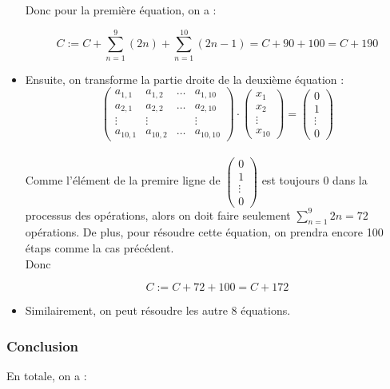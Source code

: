 \documentclass{article}
\begin{document}
\begin{itemize}
Donc pour la première équation, on a :
\begin{tcolorbox}
        \[
        C := C + \sum_{n=1}^{9}(2n) + \sum_{n=1}^{10}(2n-1) = C+90+100=C+190
        \]
\end{tcolorbox}
    \item Ensuite, on transforme la partie droite de la deuxième équation : $$\begin{pmatrix} a_{1,1} & a_{1,2} & \ldots & a_{1,10} \\
                a_{2,1} & a_{2,2} & \ldots & a_{2,10} \\
                \vdots & \vdots & & \vdots\\
                a_{10,1} & a_{10,2} & \ldots & a_{10,10}
            \end{pmatrix}\cdot\begin{pmatrix} 
            x_1\\
            x_2\\
            \vdots\\
            x_{10}
            \end{pmatrix}=\begin{pmatrix} 
            0\\
            1\\
            \vdots\\
            0
            \end{pmatrix}
    $$\\
    
Comme l'élément de la premire ligne de $\begin{pmatrix} 
            0\\
            1\\
            \vdots\\
            0
            \end{pmatrix}$ est toujours 0 dans la processus des opérations, alors on doit faire seulement $\sum_{n=1}^{9}2n=72$ opérations. De plus, pour résoudre cette équation, on prendra encore 100 étaps comme la cas précédent.\\
Donc \begin{tcolorbox}
        \[
        C := C +72+100 = C+172
        \]
        \end{tcolorbox}
    \item Similairement, on peut résoudre les autre 8 équations.\\
    \end{itemize}

\subsubsection{Conclusion}
En totale, on a :
\end{document}
